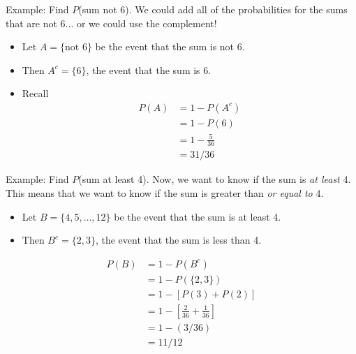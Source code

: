 \begin{frame}{Example: Find $P$(sum not 6).}
    We could add all of the probabilities for the sums that are not 6... or we could use the complement!
    \begin{itemize}
        \item Let $A=\{\text{not 6}\}$ be the event that the sum is not 6.
        \item Then $A^c=\{6\}$, the event that the sum is 6.
        \item Recall 
        \begin{align*}
            P(A) &=1-P(A^c) \\
            & =1-P(6) \\
            & =1-\frac{5}{36} \\
            &= 31/36
        \end{align*}
    \end{itemize}
\end{frame}

\begin{frame}{Example: Find $P$(sum at least 4).}
    Now, we want to know if the sum is \textit{at least} 4. This means that we want to know if the sum is greater than \textit{or equal to} 4.
    \begin{itemize}
        \item Let $B=\{4,5,\dots,12\}$ be the event that the sum is at least 4.
        \item Then $B^c=\{2,3\}$, the event that the sum is less than 4.
    \end{itemize}
    \begin{align*}
            P(B) &=1-P(B^c) \\
            & =1-P(\{2,3\}) \\
            & =1-[P(3)+P(2)] \\
            & =1-\left[\frac{2}{36}+\frac{1}{36}\right] \\
            & =1-(3/36) \\
            & =11/12
        \end{align*}
\end{frame}

